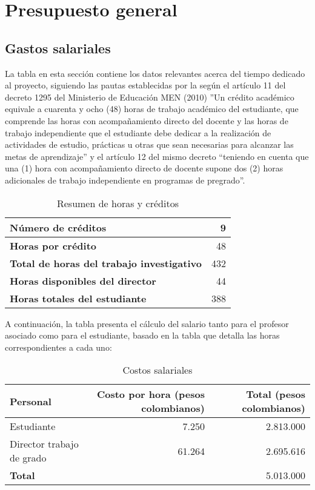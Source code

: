 \section{Presupuesto general}
\subsection{Gastos salariales}

La tabla en esta sección contiene los datos relevantes acerca del tiempo dedicado al proyecto, siguiendo las pautas establecidas por la según el artículo 11 del decreto 1295 del Ministerio de Educación MEN (2010) ”Un crédito académico equivale a cuarenta y ocho (48) horas de trabajo académico del estudiante, que comprende las horas con acompañamiento directo del docente y las horas de trabajo independiente que el estudiante debe dedicar a la realización de actividades de estudio, prácticas u otras que sean necesarias para alcanzar las metas de aprendizaje” y el artículo 12 del mismo decreto “teniendo en cuenta que una (1) hora con acompañamiento directo de docente supone dos (2) horas adicionales de trabajo independiente en programas de pregrado”.


\begin{table}[h]
    \centering
    
    \label{tab:resumen}
    \begin{tabular}{|l|r|}
        \hline
        \textbf{Número de créditos} & 9 \\
        \hline
        \textbf{Horas por crédito} & 48 \\
        \hline
        \textbf{Total de horas del trabajo investigativo} & 432 \\
        \hline
        \textbf{Horas disponibles del director} & 44 \\
        \hline
        \textbf{Horas totales del estudiante} & 388 \\
        \hline
    \end{tabular}
    \caption{Resumen de horas y créditos}
\end{table}

A continuación, la tabla presenta el cálculo del salario tanto para el profesor asociado como para el estudiante, basado en la tabla que detalla las horas correspondientes a cada uno:



\begin{table}[h]
    \centering
    \label{tab:costos}
    \begin{tabular}{|l|r|r|}
        \hline
        \textbf{Personal} & \textbf{Costo por hora} (pesos colombianos) & \textbf{Total} (pesos colombianos) \\
        \hline
        Estudiante & 7.250 & 2.813.000 \\
        Director trabajo de grado & 61.264 & 2.695.616 \\
        \hline
        \textbf{Total} & & 5.013.000 \\
        \hline
    \end{tabular}
    \caption{Costos salariales}
\end{table}
\newpage
